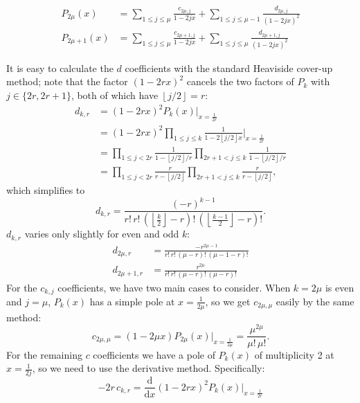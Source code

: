 \documentclass[a4paper]{amsart}
\numberwithin{equation}{section}
\newcommand{\floor}[1]{\left\lfloor #1 \right\rfloor}
\begin{document}
\begin{equation}\label{pkx}
    \begin{aligned}
    P_{2\mu}(x) &= \sum_{1 \leq j \leq \mu} \frac{c_{2\mu,j}}{1-2jx} + \sum_{1 \leq j \leq \mu-1} \frac{d_{2\mu,j}}{(1-2jx)^2} \\
    P_{2\mu+1}(x) &= \sum_{1 \leq j \leq \mu} \frac{c_{2\mu+1,j}}{1-2jx} + \sum_{1 \leq j \leq \mu} \frac{d_{2\mu+1,j}}{(1-2jx)^2}
    \end{aligned}
\end{equation}

It is easy to calculate the $d$ coefficients with the standard Heaviside cover-up method; note that the factor $(1-2rx)^2$ cancels the two factors of $P_k$ with $j \in \{2r, 2r+1\}$, both of which have $\floor{j/2} = r$:
\[
\begin{aligned}
    d_{k,r} &= (1-2rx)^2P_k(x)\big|_{x=\frac{1}{2r}} \\
    &= (1-2rx)^2 \prod_{1 \leq j \leq k} \frac{1}{1-2 \floor{j/2}x} \bigg|_{x=\frac{1}{2r}} \\
    &= \prod_{1 \leq j < 2r} \frac{1}{1-\floor{j/2}/r} \prod_{2r+1 < j \leq k} \frac{1}{1- \floor{j/2}/r} \\
    &= \prod_{1 \leq j < 2r} \frac{r}{r-\floor{j/2}} \prod_{2r+1 < j \leq k} \frac{r}{r- \floor{j/2}},
\end{aligned}
\]
which simplifies to
\begin{equation}\label{d-k-r}
        d_{k,r}=\frac{(-r)^{k-1}}{r!\,r!\,(\floor{\frac{k}{2}}-r)!\,(\floor{\frac{k-1}{2}}-r)!}.
\end{equation}
$d_{k,r}$ varies only slightly for even and odd $k$:
\[
\begin{aligned}
    d_{2\mu,r} &= \frac{-r^{2\mu-1}}{r!\,r!\,(\mu-r)!\,(\mu-1-r)!} \\
    d_{2\mu+1,r} &= \frac{r^{2\mu}}{r!\,r!\,(\mu-r)!\,(\mu-r)!}
\end{aligned}
\]
For the $c_{k,j}$ coefficients, we have two main cases to consider. When $k=2\mu$ is even and $j=\mu$, $P_k(x)$ has a simple pole at $x = \frac{1}{2\mu}$, so we get $c_{2\mu,\mu}$ easily by the same method:
\begin{equation}\label{c-2m-m}
    c_{2\mu,\mu} = (1-2\mu x)P_{2\mu}(x)\big|_{x=\frac{1}{2\mu}} = \frac{\mu^{2\mu}}{\mu!\,\mu!}.
\end{equation}
For the remaining $c$ coefficients we have a pole of $P_k(x)$ of multiplicity 2 at $x = \frac{1}{2j}$, so we need to use the derivative method. Specifically:
\[
-2r\,c_{k,r} = \frac{\mathrm{d}}{\mathrm{d}x} (1-2rx)^2P_k(x)\bigg|_{x=\frac{1}{2r}}
\]
\end{document}
